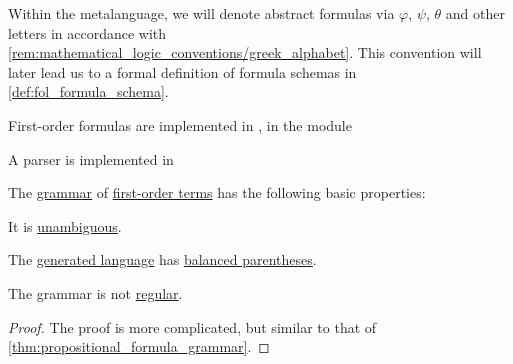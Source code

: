 \begin{comments}
  \item Within the metalanguage, we will denote abstract formulas via \( \varphi \), \( \psi \), \( \theta \) and other letters in accordance with \cref{rem:mathematical_logic_conventions/greek_alphabet}. This convention will later lead us to a formal definition of formula schemas in \cref{def:fol_formula_schema}.

  \item First-order formulas are implemented in \cite{notebook:code}, in the module
  \begin{CodeRefDisplay}
  \end{CodeRefDisplay}

  A parser is implemented in
  \begin{CodeRefDisplay}
  \end{CodeRefDisplay}
\end{comments}

\begin{proposition}\label{thm:fol_formula_grammar}
  The \hyperref[def:formal_grammar]{grammar} of \hyperref[def:fol_formula]{first-order terms} has the following basic properties:
  \begin{thmenum}
     It is \hyperref[def:grammar_ambiguity]{unambiguous}.

     The \hyperref[def:formal_grammar/language]{generated language} has \hyperref[def:paired_delimiters]{balanced parentheses}.

     The grammar is not \hyperref[def:chomsky_hierarchy/regular]{regular}.
  \end{thmenum}
\end{proposition}
\begin{proof}
  The proof is more complicated, but similar to that of \cref{thm:propositional_formula_grammar}.
\end{proof}

